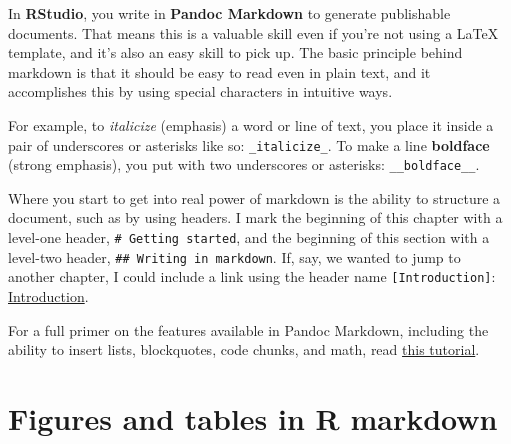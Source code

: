 \documentclass[12pt, oneside]{queensuthesis}
\numberwithin{equation}{chapter}       %
\begin{document}
In \textbf{RStudio}, you write in \textbf{Pandoc Markdown} to generate publishable documents. That means this is a valuable skill even if you're not using a LaTeX template, and it's also an easy skill to pick up. The basic principle behind markdown is that it should be easy to read even in plain text, and it accomplishes this by using special characters in intuitive ways.

For example, to \emph{italicize} (emphasis) a word or line of text, you place it inside a pair of underscores or asterisks like so: \texttt{\_italicize\_}. To make a line \textbf{boldface} (strong emphasis), you put with two underscores or asterisks: \texttt{\_\_boldface\_\_}.

Where you start to get into real power of markdown is the ability to structure a document, such as by using headers. I mark the beginning of this chapter with a level-one header, \texttt{\#\ Getting\ started}, and the beginning of this section with a level-two header, \texttt{\#\#\ Writing\ in\ markdown}. If, say, we wanted to jump to another chapter, I could include a link using the header name \texttt{{[}Introduction{]}}: \protect\hyperlink{introduction}{Introduction}.

For a full primer on the features available in Pandoc Markdown, including the ability to insert lists, blockquotes, code chunks, and math, read \href{https://rmarkdown.rstudio.com/authoring_pandoc_markdown.html}{this tutorial}.

\hypertarget{figures-and-tables-in-r-markdown}{%
\section{Figures and tables in R markdown}\label{figures-and-tables-in-r-markdown}}
\end{document}
